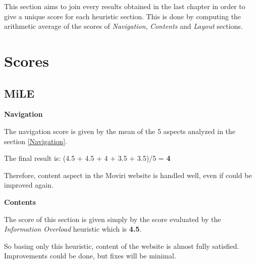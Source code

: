 This section aims to join every results obtained in the last chapter in order to give a unique score for each heuristic section. This is done by computing the arithmetic average of the scores of \textit{Navigation}, \textit{Contents} and \textit{Layout} sections.\par
\bigskip
\section{Scores}
\subsection{MiLE}
\textbf{Navigation}\par
The navigation score is given by the mean of the 5 aspects analyzed in the section \ref{Navigation}. \par 
The final result is: 
(4.5 + 4.5 + 4 + 3.5 + 3.5)/5 = \textbf{4}\par
Therefore, content aspect in the Moviri website is handled well, even if could be improved again.

\begin{figure}[H]
  \centering
\end{figure}

\par\medskip

\textbf{Contents}\par
The score of this section is given simply by the score evaluated by the \textit{Information Overload} heuristic which is \textbf{4.5}. \par
So basing only this heuristic, content of the website is almost fully satisfied. Improvements could be done, but fixes will be minimal.

\begin{figure}[H]
  \centering
\end{figure}



